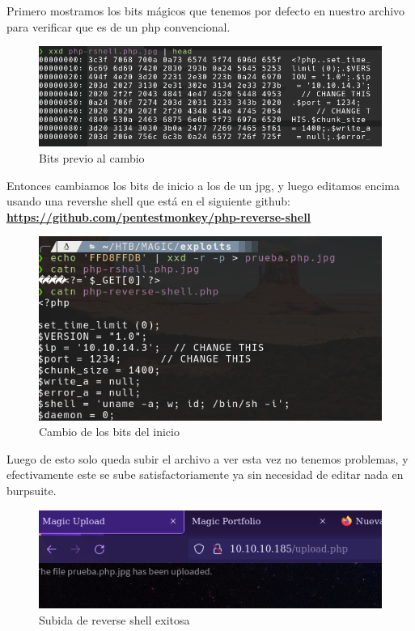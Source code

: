 \documentclass{article}
\begin{document}
Primero mostramos los bits mágicos que tenemos por defecto en nuestro archivo para verificar que es de un php convencional.

\begin{figure}[h!]
	\center 
	\includegraphics[width=\textwidth]{images/magic/muestra-bits.png}
	\caption{Bits previo al cambio}
\end{figure}

\clearpage

Entonces cambiamos los bits de inicio a los de un jpg, y luego editamos encima usando una revershe shell que está en el siguiente github: \textbf{\href{https://github.com/pentestmonkey/php-reverse-shell/blob/master/php-reverse-shell.php}{https://github.com/pentestmonkey/php-reverse-shell}}

\begin{figure}[h!]
	\center 
	\includegraphics[width=\textwidth]{images/magic/cambio-bits.png}
	\caption{Cambio de los bits del inicio}
\end{figure}

Luego de esto solo queda subir el archivo a ver esta vez no tenemos problemas, y efectivamente este se sube satisfactoriamente ya sin necesidad de editar nada en burpsuite.

\begin{figure}[h!]
	\center 
	\includegraphics[width=\textwidth]{images/magic/subida-exitosa.png}
	\caption{Subida de reverse shell exitosa}
\end{figure}
\end{document}
